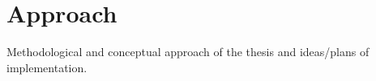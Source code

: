 \section{Approach}
\label{sec:approach}

Methodological and conceptual approach of the thesis and ideas/plans of implementation.